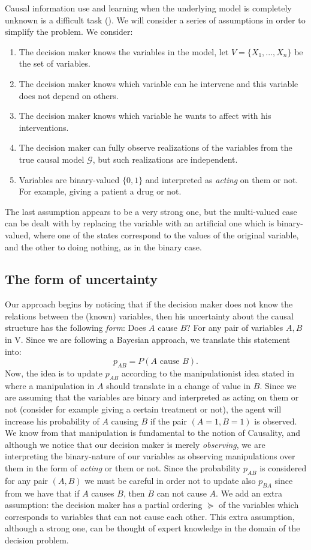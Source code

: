 \documentclass[letterpaper]{article}
\begin{document}
Causal information use and learning when the underlying model is completely unknown is a difficult task (\cite{lattimoreNIPS2016}). We will consider a series of assumptions in order to simplify the problem. We consider:
\begin{enumerate}
\item The decision maker knows the variables in the model, let $V=\{ X_1,...,X_n \}$ be the set of variables.
\item The decision maker knows which variable can he intervene and this variable does not depend on others.
\item The decision maker knows which variable he wants to affect with his interventions. 
\item The decision maker can fully observe realizations of the variables from the true causal model $\mathcal{G}$, but such realizations are independent.
\item Variables are binary-valued $\{0,1 \}$ and interpreted as \textit{acting} on them or not. For example, giving a patient a drug or not. 
\end{enumerate}
The last assumption appears to be a very strong one, but the multi-valued case can be dealt with by replacing the variable with an artificial one which is binary-valued, where one of the states correspond to the values of the original variable, and the other to doing nothing, as in the binary case.

\subsection{The form of uncertainty}
Our approach begins by noticing that if the decision maker does not know the relations between the (known) variables, then his uncertainty about the causal structure has the following \textit{form}: Does $A$ cause $B$? For any pair of variables $A,B$ in V. Since we are following a Bayesian approach, we translate this statement into:
\[p_{AB}=P(A \textrm{ cause } B). \]
Now, the idea is to update $p_{AB}$ according to the manipulationist idea stated in \cite{woodward2005making} where a manipulation in $A$ should translate in a change of value in $B$. Since we are assuming that the variables are binary and interpreted as acting on them or not (consider for example giving a certain treatment or not), the agent will increase his probability of $A$ causing $B$ if the pair $(A=1,B=1)$ is observed. We know from \cite{holland1985statistics} that manipulation is fundamental to the notion of Causality, and although we notice that our decision maker is merely \textit{observing}, we are interpreting the binary-nature of our variables as observing manipulations over them in the form of \textit{acting} or them or not. Since the probability $p_{AB}$ is considered for any pair $(A,B)$ we must be careful in order not to update also $p_{BA}$ since from \cite{spirtes2000causation} we have that if $A$ causes $B$, then $B$ can not cause $A$. We add an extra assumption: the decision maker has a partial ordering $\succeq$ of the variables which corresponds to variables that can not cause each other. This extra assumption, although a strong one, can be thought of expert knowledge in the domain of the decision problem. 
\end{document}
